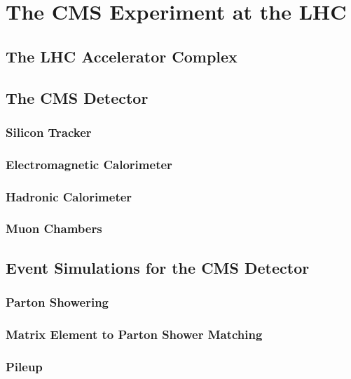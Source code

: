 
\chapter{The CMS Experiment at the LHC}
\label{ch:CMS}

\section{The LHC Accelerator Complex}

\section{The CMS Detector}

\subsection{Silicon Tracker}

\subsection{Electromagnetic Calorimeter}

\subsection{Hadronic Calorimeter}

\subsection{Muon Chambers}

\section{Event Simulations for the CMS Detector}

\subsection{Parton Showering}

\subsection{Matrix Element to Parton Shower Matching}

\subsection{Pileup}

